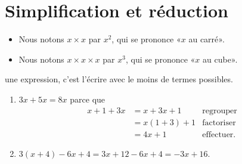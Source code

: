\section{Simplification et réduction}

\begin{definition}
    \begin{itemize}
        \item 
    Nous notons \( x\times x\) par \( x^2\), qui se prononce «\( x\) au carré».
\item
    Nous notons \( x\times x\times x\) par \( x^3\), qui se prononce «\( x\) au cube».
    \end{itemize}
\end{definition}

\begin{Aretenir}
     une expression, c'est l'écrire avec le moins de termes possibles.
\end{Aretenir}

\begin{example}
    \begin{enumerate}
        \item
            \( 3x+5x=8x\) parce que
            \begin{subequations}
                \begin{align}
                    x+1+3x&=x+3x+1&\text{regrouper}\\
                    &=x(1+3)+1&\text{factoriser}\\
                    &=4x+1&\text{effectuer}.
                \end{align}
            \end{subequations}
        \item
            \( 3(x+4)-6x+4=3x+12-6x+4=-3x+16\).
    \end{enumerate}
\end{example}


